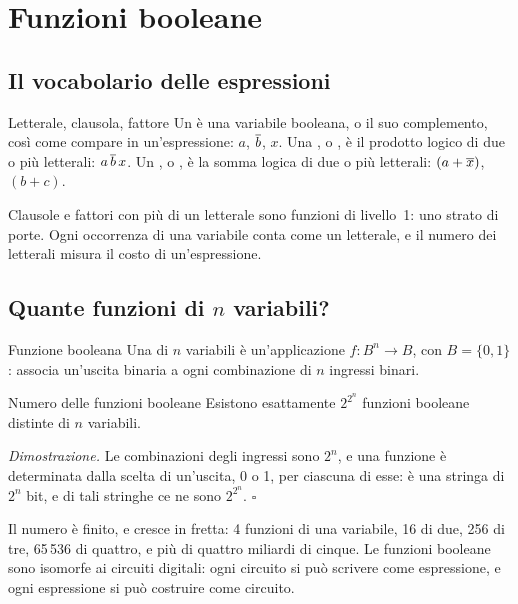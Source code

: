 \section{Funzioni booleane}

\subsection{Il vocabolario delle espressioni}

\begin{definition}{Letterale, clausola, fattore}
Un  è una variabile booleana, o il suo complemento, così come
compare in un'espressione: $a$, $\overline{b}$, $x$. Una , o
, è il prodotto logico di due o più letterali:
$a\,\overline{b}\,x$. Un , o , è la somma logica
di due o più letterali: $(a+\overline{x})$, $(b+c)$.
\end{definition}

Clausole e fattori con più di un letterale sono funzioni di livello~1: uno
strato di porte. Ogni occorrenza di una variabile conta come un letterale, e il
numero dei letterali misura il costo di un'espressione.

\subsection{Quante funzioni di $n$ variabili?}

\begin{definition}{Funzione booleana}
Una  di $n$ variabili è un'applicazione
$f:B^{n}\to B$, con $B=\{0,1\}$: associa un'uscita binaria a ogni combinazione
di $n$ ingressi binari.
\end{definition}

\begin{theorem}{Numero delle funzioni booleane}
Esistono esattamente $2^{2^{n}}$ funzioni booleane distinte di $n$ variabili.
\end{theorem}

\noindent\emph{Dimostrazione.} Le combinazioni degli ingressi sono $2^{n}$, e
una funzione è determinata dalla scelta di un'uscita, 0 o 1, per ciascuna di
esse: è una stringa di $2^{n}$ bit, e di tali stringhe ce ne sono $2^{2^{n}}$.
\hfill$\square$

\smallskip
Il numero è finito, e cresce in fretta: 4 funzioni di una variabile, 16 di due,
256 di tre, 65\,536 di quattro, e più di quattro miliardi di cinque. Le
funzioni booleane sono isomorfe ai circuiti digitali: ogni circuito si può
scrivere come espressione, e ogni espressione si può costruire come circuito.

